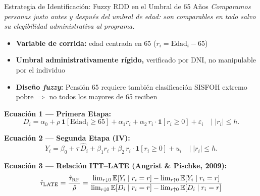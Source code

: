 \documentclass[aspectratio=169, 10pt]{beamer}
\begin{document}
\begin{frame}{Estrategia de Identificación: Fuzzy RDD en el Umbral de 65 Años}
  \small
  \textit{Comparamos personas justo antes y después del umbral de edad: son
  comparables en todo salvo su elegibilidad administrativa al programa.}

  \vspace{4pt}
  \begin{itemize}
    \setlength\itemsep{3pt}
    \item \textbf{Variable de corrida:} edad centrada en 65 ($r_i = \text{Edad}_i - 65$)
    \item \textbf{Umbral administrativamente rígido,} verificado por DNI,
          no manipulable por el individuo
    \item \textbf{Diseño \emph{fuzzy}:} Pensión 65 requiere también clasificación
          SISFOH extremo pobre $\Rightarrow$ no todos los mayores de 65 reciben
  \end{itemize}

  \vspace{6pt}
  \textbf{Ecuación 1 — Primera Etapa:}
  \begin{equation*}
    D_i = \alpha_0
        + \rho\,\mathbf{1}[\text{Edad}_i \geq 65]
        + \alpha_1 r_i
        + \alpha_2\,r_i \cdot \mathbf{1}[r_i \geq 0]
        + \varepsilon_i
    \quad\bigl|\;|r_i| \leq h\bigr.
  \end{equation*}

  \textbf{Ecuación 2 — Segunda Etapa (IV):}
  \begin{equation*}
    Y_i = \beta_0
        + \tau\,\widehat{D}_i
        + \beta_1 r_i
        + \beta_2\,r_i \cdot \mathbf{1}[r_i \geq 0]
        + u_i
    \quad\bigl|\;|r_i| \leq h\bigr.
  \end{equation*}

  \textbf{Ecuación 3 — Relación ITT–LATE (Angrist \& Pischke, 2009):}
  \begin{equation*}
    \hat{\tau}_{\text{LATE}}
    = \frac{\hat{\tau}_{\text{RF}}}{\hat{\rho}}
    = \frac{%
        \lim_{r \downarrow 0}\mathbb{E}[Y_i \mid r_i=r]
        - \lim_{r \uparrow 0}\mathbb{E}[Y_i \mid r_i=r]}{%
        \lim_{r \downarrow 0}\mathbb{E}[D_i \mid r_i=r]
        - \lim_{r \uparrow 0}\mathbb{E}[D_i \mid r_i=r]}
  \end{equation*}
\end{frame}
\end{document}
